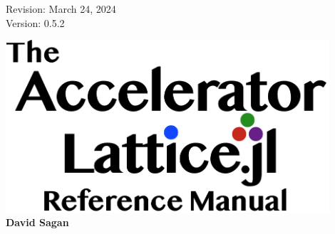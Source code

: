 
\thispagestyle{empty}

\hfill
\large\parbox[b]{1.8in}{
  Revision: March 24, 2024 \\
  Version: 0.5.2
}


\vfill

{
\begin{center}
\includegraphics[width=12cm]{AcceleratorLattice-manual-logo.pdf} \\
\vskip 0.3in
\huge\bf David Sagan
\end{center}
}

\vfill
\break
